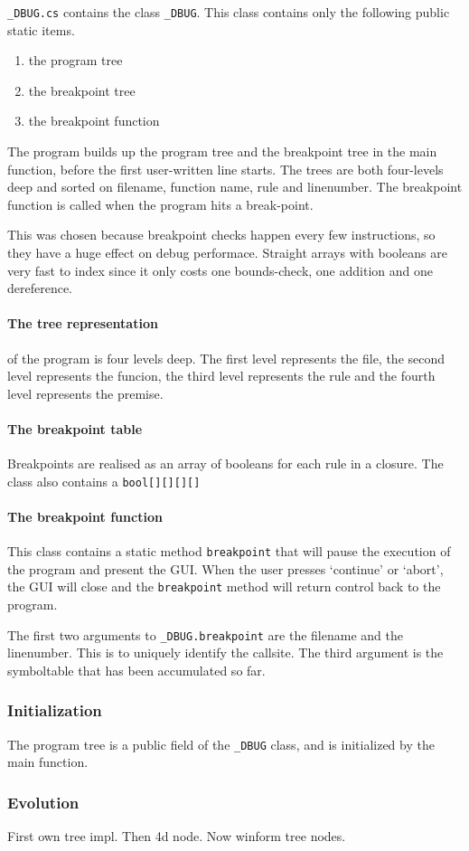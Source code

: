 \verb|_DBUG.cs| contains the class \verb|_DBUG|.
This class contains only the following public static items.

\begin{enumerate}
    \item the program tree
    \item the breakpoint tree
    \item the breakpoint function
\end{enumerate}

The program builds up the program tree and the breakpoint tree in the main function, before the first user-written line starts.
The trees are both four-levels deep and sorted on filename, function name, rule and linenumber.
The breakpoint function is called when the program hits a break-point.

This was chosen because breakpoint checks happen every few instructions, so they have a huge effect on debug performace.
Straight arrays with booleans are very fast to index since it only costs one bounds-check, one addition and one dereference.

\paragraph{The tree representation} of the program is four levels deep.
The first level represents the file, the second level represents the funcion, the third level represents the rule and the fourth level represents the premise.

\paragraph{The breakpoint table} 
Breakpoints are realised as an array of booleans for each rule in a closure.
The class also contains a \verb|bool[][][][]| 

\paragraph{The breakpoint function}
This class contains a static method \verb|breakpoint| that will pause the execution of the program and present the GUI.
When the user presses `continue' or `abort', the GUI will close and the \verb|breakpoint| method will return control back to the program.

The first two arguments to \verb|_DBUG.breakpoint| are the filename and the linenumber.
This is to uniquely identify the callsite.
The third argument is the symboltable that has been accumulated so far.

\subsubsection{Initialization}
The program tree is a public field of the \verb|_DBUG| class, and is initialized by the main function.

\subsubsection{Evolution}
First own tree impl.
Then 4d node.
Now winform tree nodes.

